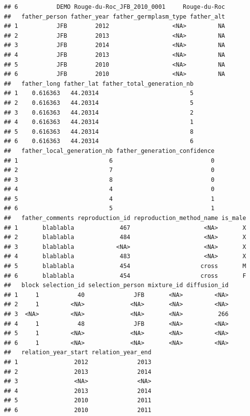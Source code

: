 \documentclass{article}\usepackage[]{graphicx}\usepackage[]{color}
\makeatletter
\newenvironment{kframe}{%
 \def\at@end@of@kframe{}%
 \ifinner\ifhmode%
  \def\at@end@of@kframe{\end{minipage}}%
  \begin{minipage}{\columnwidth}%
 \fi\fi%
 \def\FrameCommand##1{\hskip\@totalleftmargin \hskip-\fboxsep
 \colorbox{shadecolor}{##1}\hskip-\fboxsep
     \hskip-\linewidth \hskip-\@totalleftmargin \hskip\columnwidth}%
 \MakeFramed {\advance\hsize-\width
   \@totalleftmargin\z@ \linewidth\hsize
   \@setminipage}}%
 {\par\unskip\endMakeFramed%
 \at@end@of@kframe}
\newenvironment{knitrout}{}{} %
\makeatother
\begin{document}
\begin{itemize}
\begin{knitrout}
\begin{kframe}
\begin{verbatim}
## 6           DEMO Rouge-du-Roc_JFB_2010_0001     Rouge-du-Roc
##   father_person father_year father_germplasm_type father_alt
## 1           JFB        2012                  <NA>         NA
## 2           JFB        2013                  <NA>         NA
## 3           JFB        2014                  <NA>         NA
## 4           JFB        2013                  <NA>         NA
## 5           JFB        2010                  <NA>         NA
## 6           JFB        2010                  <NA>         NA
##   father_long father_lat father_total_generation_nb
## 1    0.616363   44.20314                          5
## 2    0.616363   44.20314                          5
## 3    0.616363   44.20314                          2
## 4    0.616363   44.20314                          1
## 5    0.616363   44.20314                          8
## 6    0.616363   44.20314                          6
##   father_local_generation_nb father_generation_confidence
## 1                          6                            0
## 2                          7                            0
## 3                          8                            0
## 4                          4                            0
## 5                          4                            1
## 6                          5                            1
##   father_comments reproduction_id reproduction_method_name is_male
## 1       blablabla             467                     <NA>       X
## 2       blablabla             484                     <NA>       X
## 3       blablabla            <NA>                     <NA>       X
## 4       blablabla             483                     <NA>       X
## 5       blablabla             454                    cross       M
## 6       blablabla             454                    cross       F
##   block selection_id selection_person mixture_id diffusion_id
## 1     1           40              JFB       <NA>         <NA>
## 2     1         <NA>             <NA>       <NA>         <NA>
## 3  <NA>         <NA>             <NA>       <NA>          266
## 4     1           48              JFB       <NA>         <NA>
## 5     1         <NA>             <NA>       <NA>         <NA>
## 6     1         <NA>             <NA>       <NA>         <NA>
##   relation_year_start relation_year_end
## 1                2012              2013
## 2                2013              2014
## 3                <NA>              <NA>
## 4                2013              2014
## 5                2010              2011
## 6                2010              2011
\end{verbatim}
\end{kframe}
\end{knitrout}



\end{itemize}
\end{document}
